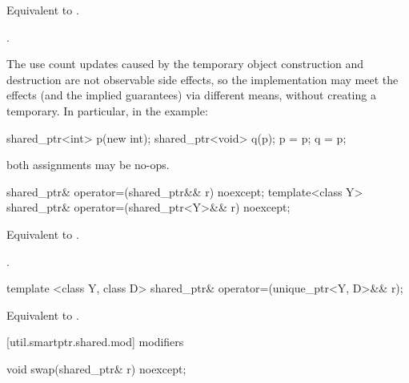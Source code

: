 \begin{itemdescr}
\pnum\effects  Equivalent to .

\pnum\returns  {}.

\pnum \enternote
The use count updates caused by the temporary object
construction and destruction are not observable side
effects, so the implementation may meet the effects (and the
implied guarantees) via different means, without creating a
temporary. In particular, in the example:
\begin{codeblock}
shared_ptr<int> p(new int);
shared_ptr<void> q(p);
p = p;
q = p;
\end{codeblock}
both assignments may be no-ops. \exitnote
\end{itemdescr}

%
%
\begin{itemdecl}
shared_ptr& operator=(shared_ptr&& r) noexcept;
template<class Y> shared_ptr& operator=(shared_ptr<Y>&& r) noexcept;
\end{itemdecl}

\begin{itemdescr}
\pnum
\effects Equivalent to .

\pnum
\returns {}.
\end{itemdescr}

%
%
\begin{itemdecl}
template <class Y, class D> shared_ptr& operator=(unique_ptr<Y, D>&& r);
\end{itemdecl}

\begin{itemdescr}
\pnum
\effects Equivalent to .

\pnum
\returns {}
\end{itemdescr}



[util.smartptr.shared.mod]{ modifiers}

%
%
\begin{itemdecl}
void swap(shared_ptr& r) noexcept;
\end{itemdecl}

